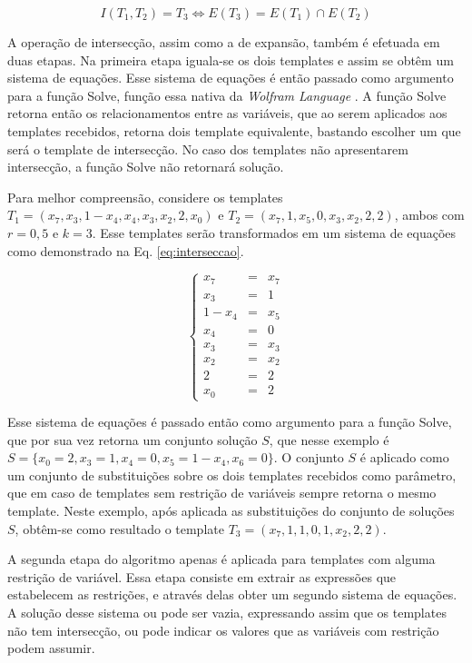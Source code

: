 \begin{equation}
I(T_1,T_2)=T_3 \Leftrightarrow E(T_3) = E(T_1) \cap E(T_2)
\end{equation}

A operação de intersecção, assim como a de expansão, também é efetuada em duas etapas. Na primeira etapa iguala-se os dois templates e assim se obtêm um sistema de equações. Esse sistema de equações é então passado como argumento para a função Solve, função essa nativa da \textit{Wolfram Language} \cite{woframMathematica10}. A função Solve retorna então os relacionamentos entre as variáveis, que ao serem aplicados aos templates recebidos, retorna dois template equivalente, bastando escolher um que será o template de intersecção. No caso dos templates não apresentarem intersecção, a função Solve não retornará solução.

Para melhor compreensão, considere os templates $T_1 = (x_7,x_3,1-x_4,x_4,x_3,x_2,2,x_0)$ e $T_2 = (x_7,1,x_5,0,x_3,x_2,2,2)$, ambos com $r=0{,}5$ e $k=3$. Esse templates serão transformados em um sistema de equações como demonstrado na Eq. \eqref{eq:interseccao}.

\begin{equation}
\left\{\begin{matrix}
x_7   & = & x_7 \\ 
x_3   & = & 1 \\ 
1-x_4 & = & x_5    \\ 
x_4   & = & 0    \\ 
x_3   & = & x_3    \\ 
x_2   & = & x_2   \\ 
2     & = & 2   \\ 
x_0   & = & 2
\end{matrix}\right.
\label{eq:interseccao}
\end{equation}

Esse sistema de equações é passado então como argumento para a função Solve, que por sua vez retorna um conjunto solução $S$, que nesse exemplo é $S = \{x_0 = 2, x_3 = 1, x_4 = 0, x_5 = 1 - x_4, x_6 = 0\}$. O conjunto $S$ é aplicado como um conjunto de substituições sobre os dois templates recebidos como parâmetro, que em caso de templates sem restrição de variáveis sempre retorna o mesmo template. Neste exemplo, após aplicada as substituições do conjunto de soluções $S$, obtêm-se como resultado o template $T_3 = (x_7, 1, 1, 0, 1, x_2, 2, 2)$.

A segunda etapa do algoritmo apenas é aplicada para templates com alguma restrição de variável. Essa etapa consiste em extrair as expressões que estabelecem as restrições, e através delas obter um segundo sistema de equações. A solução desse sistema ou pode ser vazia, expressando assim que os templates não tem intersecção, ou pode indicar os valores que as variáveis com restrição podem assumir.

